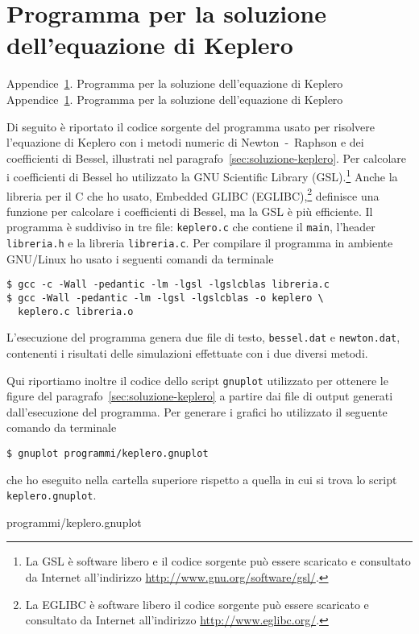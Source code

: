 \chapter{Programma per la soluzione dell'equazione di Keplero}
\label{cha:soluzione-keplero}
\markboth%
{Appendice~\ref{cha:soluzione-keplero}. Programma per la soluzione
  dell'equazione di Keplero}%
{Appendice~\ref{cha:soluzione-keplero}. Programma per la soluzione
  dell'equazione di Keplero}

Di seguito è riportato il codice sorgente del programma usato per risolvere
l'equazione di Keplero con i metodi numeric di Newton~-~Raphson e dei
coefficienti di Bessel, illustrati nel
paragrafo~\ref{sec:soluzione-keplero}. Per calcolare i coefficienti di Bessel ho
utilizzato la GNU Scientific Library (GSL).\footnote{La GSL è software libero e
  il codice sorgente può essere scaricato e consultato da Internet all'indirizzo
  \url{http://www.gnu.org/software/gsl/}.} Anche la libreria per il C che ho
usato, Embedded GLIBC (EGLIBC),\footnote{La EGLIBC è software libero il codice
  sorgente può essere scaricato e consultato da Internet all'indirizzo
  \url{http://www.eglibc.org/}.} definisce una funzione per calcolare i
coefficienti di Bessel, ma la GSL è più efficiente. Il programma è suddiviso in
tre file: \verb|keplero.c| che contiene il \verb|main|, l'header
\verb|libreria.h| e la libreria \verb|libreria.c|. Per compilare il programma in
ambiente GNU/Linux ho usato i seguenti comandi da terminale
\begin{verbatim}
$ gcc -c -Wall -pedantic -lm -lgsl -lgslcblas libreria.c
$ gcc -Wall -pedantic -lm -lgsl -lgslcblas -o keplero \
  keplero.c libreria.o
\end{verbatim}
L'esecuzione del programma genera due file di testo, \verb|bessel.dat| e
\verb|newton.dat|, contenenti i risultati delle simulazioni effettuate con i due
diversi metodi.
% 
% 
% 

Qui riportiamo inoltre il codice dello script \verb|gnuplot| utilizzato per
ottenere le figure del paragrafo~\ref{sec:soluzione-keplero} a partire dai file
di output generati dall'esecuzione del programma. Per generare i grafici ho
utilizzato il seguente comando da terminale
\begin{verbatim}
$ gnuplot programmi/keplero.gnuplot
\end{verbatim}
che ho eseguito nella cartella superiore rispetto a quella in cui si trova lo
script \verb|keplero.gnuplot|.

{programmi/keplero.gnuplot}

